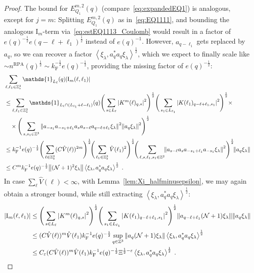 \documentclass[12pt,a4paper]{article}
\numberwithin{equation}{section}
\newcommand{\1}{\mathbb{I}}
\newcommand{\F}{\mathrm{F}}
\newcommand{\I}{\mathrm{I}}
\newcommand{\RPA}{\mathrm{RPA}}
\newcommand{\Z}{\mathbb{Z}}
\newcommand{\NN}{\mathcal{N}}
\newcommand{\half}{\frac{1}{2}}
\newcommand{\eva}[1]{\left\langle #1 \right\rangle}
\theoremstyle{plain}
\theoremstyle{definition}
\theoremstyle{remark}
\theoremstyle{plain}
\theoremstyle{definition}
\theoremstyle{remark}
\begin{document}
\begin{proof}
The bound for $ E^{m,2}_{Q_1}(q) $ (compare~\eqref{eq:expandedEQ1}) is analogous, except for $ j = m $: Splitting $ E^{m,2}_{Q_1}(q) $ as in~\eqref{eq:EQ1111}, and bounding the analogous $ \I_m $-term via~\eqref{eq:estEQ1113_Coulomb} would result in a factor of $ e(q)^{-\half} e(q-\ell+\ell_1)^{\half} $ instead of $ e(q)^{-1} $. However, $ a_{q-\ell_1} $ gets replaced by $ a_q $, so we can recover a factor $ \eva{\xi_\lambda, a_q^* a_q \xi_\lambda}^{\half} $, which we expect to finally scale like $ \sim n^{\RPA}(q)^{\half} \sim k_{\F}^{-\half} e(q)^{-\half} $, providing the missing factor of $ e(q)^{-\half} $: 
\begin{align}
		&\sum_{\ell,\ell_1 \in \Z^3_*} \mathds{1}_{L_\ell}(q) |\I_m(\ell, \ell_1)| \nonumber\\
		&\leq \sum_{\ell,\ell_1 \in \Z^3_*} \mathds{1}_{L_\ell \cap (L_{\ell_1}+\ell-\ell_1) }(q)
		\Bigg(\sum\limits_{s \in L_{\ell}} \abs{K^m(\ell)_{q,s}}^2\Bigg)^\half
		\Bigg(\sum\limits_{s_1 \in L_{\ell_1}} \abs{K(\ell_1)_{q-\ell+\ell_1,s_1}}^2\Bigg)^\half \times \nonumber\\
		&\quad \times \Bigg( \sum_{s,s_1 \in \Z^3} \norm{ a_{-s_1} a_{-s_1+\ell_1} a_s a_{s-\ell} a_{q-\ell+\ell_1} \xi_\lambda}^2
		\norm{ a_q \xi_\lambda }^2 \Bigg)^{\half} \nonumber\\
		&\leq k_{\F}^{-1} e(q)^{-\frac 12}
		\Bigg(\sum_{\ell \in \Z^3_*} (C \hat{V}(\ell))^{2m} \Bigg)^\half \!
		\Bigg(\sum_{\ell_1 \in \Z^3_*} \hat{V}(\ell_1)^2 \Bigg)^\half \!
		\Bigg( \sum_{\ell, s, \ell_1, s_1 \in \Z^3}  \!\!\norm{ a_{s-\ell} a_s a_{-s_1+\ell_1} a_{-s_1} \xi_\lambda}^2\Bigg)^{\half} \!
		\norm{ a_q \xi_\lambda }  \nonumber\\
		&\leq C^m k_{\F}^{-1} e(q)^{-\frac 12}
			\norm{ (\NN+1)^2 \xi_\lambda }
			\eva{\xi_{\lambda},a_q^* a_q\xi_{\lambda}}^{\half} \;. \label{eq:estEQ1113_Coulomb_bis}
\end{align}
In case $ \sum_\ell \hat{V}(\ell) < \infty $, with Lemma~\ref{lem:Xi_halfminusepsilon}, we may again obtain a stronger bound, while still extracting $ \eva{\xi_\lambda, a_q^* a_q \xi_\lambda}^{\half} $:
\begin{align}
		|\I_m(\ell, \ell_1)|
		&\leq \Bigg(\sum\limits_{s \in L_{\ell}} \abs{K^m(\ell)_{q,s}}^2\Bigg)^\half
		\Bigg(\sum\limits_{s_1 \in L_{\ell_1}} \abs{K(\ell_1)_{q-\ell+\ell_1,s_1}}^2\Bigg)^\half
		\norm{ a_{q-\ell+\ell_1} (\NN+1) \xi_\lambda}
		\norm{ a_q \xi_\lambda }\nonumber\\
		&\leq (C \hat{V}(\ell))^m \hat{V}(\ell_1) k_{\F}^{-1} e(q)^{-\half}
		\sup_{q \in \Z^3} \norm{ a_q (\NN+1) \xi_\lambda }
		\eva{\xi_{\lambda},a_q^* a_q\xi_{\lambda}}^{\half} \nonumber\\
		&\leq C_\varepsilon (C \hat{V}(\ell))^m
		\hat{V}(\ell_1)
		k_{\F}^{-1} e(q)^{-\half} \Xi^{\half-\varepsilon} \eva{\xi_{\lambda},a_q^* a_q\xi_{\lambda}}^{\half} \;. \label{eq:estEQ1113_bis}
\end{align}
\end{proof}
\end{document}
